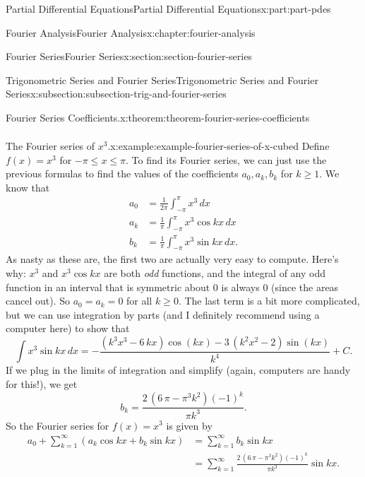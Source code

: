 \documentclass[twoside,10pt,]{book}
\numberwithin{equation}{part}
\newcommand{\amp}{&}
\begin{document}
\begin{partptx}{Partial Differential Equations}{}{Partial Differential Equations}{}{}{x:part:part-pdes}
\begin{chapterptx}{Fourier Analysis}{}{Fourier Analysis}{}{}{x:chapter:fourier-analysis}
\begin{sectionptx}{Fourier Series}{}{Fourier Series}{}{}{x:section:section-fourier-series}
\begin{subsectionptx}{Trigonometric Series and Fourier Series}{}{Trigonometric Series and Fourier Series}{}{}{x:subsection:subsection-trig-and-fourier-series}
\begin{theorem}{Fourier Series Coefficients.}{}{x:theorem:theorem-fourier-series-coefficients}
\begin{align*}
\end{align*}
%
\end{theorem}
\begin{example}{The Fourier series of \(x^{3}\).}{x:example:example-fourier-series-of-x-cubed}%
Define \(f(x) = x^{3}\) for \(-\pi\leq x\leq \pi\). To find its Fourier series, we can just use the previous formulas to find the values of the coefficients \(a_{0},a_{k},b_{k}\) for \(k\geq1\). We know that%
\begin{align*}
a_{0} \amp = \frac{1}{2\pi}\int_{-\pi}^{\pi}x^{3}\,dx\\
a_{k} \amp = \frac{1}{\pi}\int_{-\pi}^{\pi}x^{3}\cos kx\,dx \\
b_{k} \amp = \frac{1}{\pi}\int_{-\pi}^{\pi}x^{3}\sin kx\,dx.
\end{align*}
As nasty as these are, the first two are actually very easy to compute. Here's why: \(x^{3}\) and \(x^{3}\cos kx\) are both \emph{odd} functions, and the integral of any odd function in an interval that is symmetric about \(0\) is always \(0\) (since the areas cancel out). So \(a_{0} = a_{k} = 0\) for all \(k\geq0\). The last term is a bit more complicated, but we can use integration by parts (and I definitely recommend using a computer here) to show that%
\begin{equation*}
\int x^{3}\sin kx\,dx = -\frac{{\left(k^{3} x^{3} - 6 \, k x\right)} \cos\left(k x\right) - 3 \, {\left(k^{2} x^{2} - 2\right)} \sin\left(k x\right)}{k^{4}} + C.
\end{equation*}
If we plug in the limits of integration and simplify (again, computers are handy for this!), we get%
\begin{equation*}
b_{k} = \frac{2 \, {\left(6 \, \pi - \pi^{3} k^{2}\right)} \left(-1\right)^{k}}{\pi k^{3}}.
\end{equation*}
So the Fourier series for \(f(x) = x^{3}\) is given by%
\begin{align*}
a_{0} + \sum_{k=1}^{\infty}(a_{k}\cos kx+b_{k}\sin kx) \amp= \sum_{k=1}^{\infty}b_{k}\sin kx \\
\amp= \sum_{k=1}^{\infty}\frac{2 \, {\left(6 \, \pi - \pi^{3} k^{2}\right)} \left(-1\right)^{k}}{\pi k^{3}}\sin kx. 
\end{align*}
%
\end{example}

\end{subsectionptx}
\end{sectionptx}
\end{chapterptx}
\end{partptx}
\end{document}
